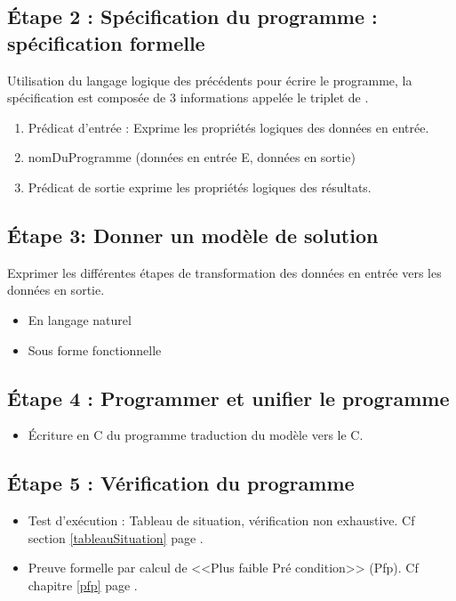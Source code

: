		\subsection{\'Etape 2 : Spécification du programme : spécification formelle}
		Utilisation du langage logique des précédents pour écrire le programme, la spécification est composée de 3 informations appelée le triplet de .
			\begin{enumerate}
				\item Prédicat d'entrée : Exprime les propriétés logiques des données en entrée. 
				\item nomDuProgramme (données en entrée E, données en sortie) 
				\item Prédicat de sortie exprime les propriétés logiques des résultats.
			\end{enumerate}
			\subsection{\'Etape 3: Donner un modèle de solution}
			Exprimer les différentes étapes de transformation des données en entrée vers les données en sortie. 
			\begin{itemize}
				\item En langage naturel
				\item Sous forme fonctionnelle
			\end{itemize}
			\newpage
		\subsection{\'Etape 4 : Programmer et unifier le programme}	
		\begin{itemize}
			\item \'Ecriture en C du programme traduction du modèle vers le C.
		\end{itemize}
		\subsection{\'Etape 5 : Vérification du programme}
				\begin{itemize}
					\item Test d'exécution : Tableau de situation, vérification non exhaustive. Cf section \ref{tableauSituation} page \pageref{tableauSituation}.
					\item Preuve formelle par calcul de <<Plus faible Pré condition>> (Pfp). Cf chapitre \ref{pfp} page \pageref{pfp}.
			\end{itemize}
